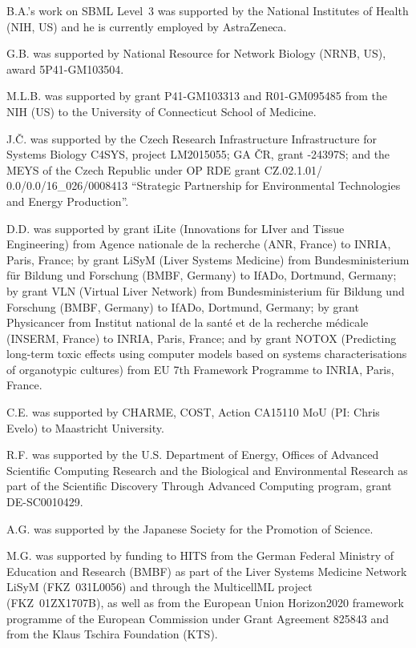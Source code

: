 \documentclass{sbml-paper}
\begin{document}
B.A.'s work on SBML Level~3 was supported by the National Institutes of Health (NIH, US) and he is currently employed by AstraZeneca.

G.B. was supported by National Resource for Network Biology (NRNB, US), award \No 5P41-GM103504.

M.L.B. was supported by grant \No P41-GM103313 and R01-GM095485 from the NIH (US) to the University of Connecticut School of Medicine.

J.Č. was supported by the Czech Research Infrastructure Infrastructure for Systems Biology C4SYS, project \No LM2015055; GA ČR, grant -24397S; and the MEYS of the Czech Republic under OP RDE grant \No CZ.02.1.01/ 0.0/0.0/16\_026/0008413 ``Strategic Partnership for Environmental Technologies and Energy Production''.

D.D. was supported by grant iLite (Innovations for LIver and Tissue Engineering) from Agence nationale de la recherche (ANR, France) to INRIA, Paris, France; by grant LiSyM (Liver Systems Medicine) from Bundesministerium für Bildung und Forschung (BMBF, Germany) to IfADo, Dortmund, Germany; by grant VLN (Virtual Liver Network) from Bundesministerium für Bildung und Forschung (BMBF, Germany) to IfADo, Dortmund, Germany; by grant Physicancer from Institut national de la santé et de la recherche médicale (INSERM, France) to INRIA, Paris, France; and by grant NOTOX (Predicting long-term toxic effects using computer models based on systems characterisations of organotypic cultures) from EU 7th Framework Programme to INRIA, Paris, France.

C.E. was supported by CHARME, COST, Action CA15110 MoU (PI: Chris Evelo) to Maastricht University.

R.F. was supported by the U.S. Department of Energy, Offices of Advanced Scientific Computing Research and the Biological and Environmental Research as part of the Scientific Discovery Through Advanced Computing program, grant \No DE-SC0010429.

A.G. was supported by the Japanese Society for the Promotion of Science.

M.G. was supported by funding to HITS from the German Federal Ministry of Education and Research (BMBF) as part of the Liver Systems Medicine Network LiSyM (FKZ~031L0056) and through the MulticellML project (FKZ~01ZX1707B), as well as from the European Union Horizon2020 framework programme of the European Commission under Grant Agreement 825843 and from the Klaus Tschira Foundation (KTS).
\end{document}
